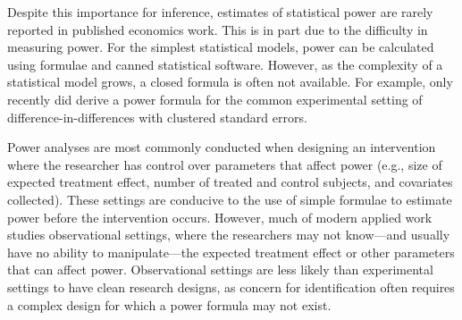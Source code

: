\documentclass[12pt]{article}%
\begin{document}
Despite this importance for inference, estimates of statistical power are rarely reported in published economics work. 
This is in part due to the difficulty in measuring power. 
For the simplest statistical models, power can be calculated using formulae and canned statistical software. 
However, as the complexity of a statistical model grows, a closed formula is often not available.  
For example, only recently did \citet{Burlig2019} derive a power formula for the common experimental setting of difference-in-differences with clustered standard errors.

Power analyses are most commonly conducted when designing an intervention  where the researcher has control over parameters that affect power (e.g., size of expected treatment effect, number of treated and control subjects, and covariates collected).
These settings are conducive to the use of simple formulae to estimate power before the intervention occurs. 
However, much of modern applied work studies observational settings, where the researchers may not know---and usually have no ability to manipulate---the expected treatment effect or other parameters that can affect power.  
Observational settings are less likely than experimental settings to have clean research designs, as concern for identification often  requires a complex design for which a power formula may not exist. 
\end{document}

